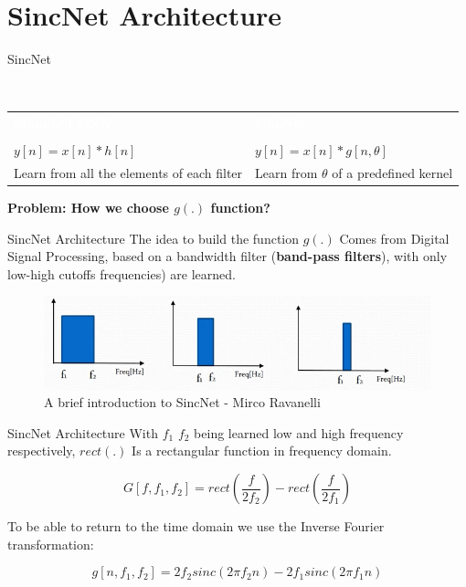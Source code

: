 \documentclass[notheorems, aspectratio=54]{beamer}
\begin{document}
\section{SincNet Architecture}
\begin{frame}{SincNet}
	\begin{block}{~\vspace{0.7cm}}
		\begin{center}
			\vspace{-0.8cm}
			\begin{tabular}{p{0.45\textwidth}|p{}}
				\textcolor{white}{\bf Standard CNN} & \textcolor{white}{\bf SincNet} \\\\
				$y[n] = x[n] * h[n]$ & $y[n] = x[n] * g[n, \theta]$\\
				Learn from all the elements of each filter & Learn from $\theta$ of a predefined kernel\\
			\end{tabular}
		\end{center}
	\end{block}
	\textbf{Problem: How we choose $g(.)$ function?}
\end{frame}
\begin{frame}{SincNet Architecture}
	The idea to build the function $g (.)$ Comes from Digital Signal Processing, based on a bandwidth filter (\textbf{band-pass filters}), with only low-high cutoffs frequencies) are learned.
	\begin{figure}[H]
		\includegraphics[width=0.9\linewidth]{images/band_passfilters.png}
		\caption{A brief introduction to SincNet - Mirco Ravanelli}
		\label{fig:writing-thesis}
	\end{figure}
\end{frame}
\begin{frame}{SincNet Architecture}
	With $ f_1 $ $ f_2 $ being learned low and high frequency respectively, $ rect (.) $ Is a rectangular function in frequency domain.
	
	$$G[f, f_1, f_2] = rect\left(\frac{f}{2f_2}\right) -  rect\left(\frac{f}{2f_1}\right)$$
	
	To be able to return to the time domain we use the Inverse Fourier transformation:
	
	$$g[n, f_1, f_2] = 2f_2sinc(2\pi f_2 n) - 2f_1sinc(2\pi f_1 n)$$ 
\end{frame}
\end{document}
